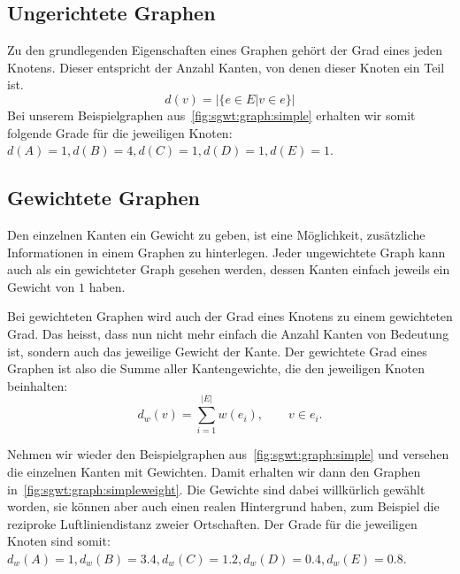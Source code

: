 \subsection{Ungerichtete Graphen}

Zu den grundlegenden Eigenschaften eines Graphen geh\"ort der Grad eines jeden 
Knotens. Dieser entspricht der Anzahl Kanten, von denen dieser Knoten ein 
Teil ist.
\begin{equation*}
    d(v) = | \{e \in E | v \in e \} |
\end{equation*}
Bei unserem Beispielgraphen aus~\cref{fig:sgwt:graph:simple} 
erhalten wir somit folgende Grade f\"ur die jeweiligen Knoten: $d(A) = 1, d(B) 
= 4, d(C) = 1, d(D) = 1, d(E) = 1$.

\subsection{Gewichtete Graphen}

Den einzelnen Kanten ein Gewicht zu geben, ist eine M\"oglichkeit, 
zus\"atzliche Informationen in einem Graphen zu hinterlegen. Jeder ungewichtete 
Graph kann auch als ein gewichteter Graph gesehen werden, dessen Kanten einfach 
jeweils ein Gewicht von $1$ haben.

Bei gewichteten Graphen wird auch der Grad eines Knotens zu einem gewichteten 
Grad. Das heisst, dass nun nicht mehr einfach die Anzahl Kanten von Bedeutung 
ist, sondern auch das jeweilige Gewicht der Kante. Der gewichtete Grad eines 
Graphen ist also die Summe aller Kantengewichte, die den jeweiligen Knoten 
beinhalten:
\begin{equation*}
    d_w(v) = \sum_{i = 1}^{|E|}w(e_i), \qquad v \in e_i.
\end{equation*}

Nehmen wir wieder den Beispielgraphen aus~\cref{fig:sgwt:graph:simple} und 
versehen die einzelnen Kanten mit Gewichten. Damit erhalten wir dann den 
Graphen in~\cref{fig:sgwt:graph:simpleweight}. Die Gewichte sind dabei 
willk\"urlich gew\"ahlt worden, sie k\"onnen aber auch einen realen Hintergrund 
haben, zum Beispiel die reziproke Luftliniendistanz zweier Ortschaften. Der 
Grade f\"ur die jeweiligen Knoten sind somit: $d_w(A) = 1, d_w(B) = 3.4, d_w(C) 
= 1.2, d_w(D) = 0.4, d_w(E) = 0.8$.

